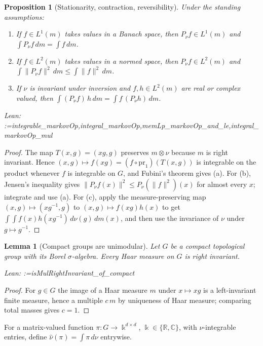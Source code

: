 \documentclass[11pt]{amsart}
\makeatletter
\newtheorem{proposition}[theorem]{Proposition}
\newtheorem{lemma}[theorem]{Lemma}
\theoremstyle{definition}
\theoremstyle{remark}
\newcommand{\@leanlist}[1]{\def\@leansep{}\@for\@leanname:=#1\do{\@leansep
  \texttt{\expandafter\detokenize\expandafter{\@leanname}}\def\@leansep{, }}}
\newcommand{\lean}[1]{\par\smallskip\noindent
  {\footnotesize\normalfont\raggedright\textsf{Lean:} \@leanlist{#1}\par}}
\newcommand{\R}{\mathbb{R}}
\newcommand{\C}{\mathbb{C}}
\makeatother
\begin{document}
\begin{proposition}[Stationarity, contraction, reversibility]\label{prop:compact-basic}
Under the standing assumptions:
\begin{enumerate}
\item[(a)] If $f\in L^1(m)$ takes values in a Banach space, then $P_\nu f\in L^1(m)$ and
$\int P_\nu f\,dm=\int f\,dm$.
\item[(b)] If $f\in L^2(m)$ takes values in a normed space, then $P_\nu f\in L^2(m)$ and
$\int\lVert P_\nu f\rVert^2\,dm\le\int\lVert f\rVert^2\,dm$.
\item[(c)] If $\nu$ is invariant under inversion and $f,h\in L^2(m)$ are real or complex valued,
then $\int(P_\nu f)\,h\,dm=\int f\,(P_\nu h)\,dm$.
\end{enumerate}
\lean{integrable_markovOp,integral_markovOp,memLp_markovOp_and_le,integral_markovOp_mul}
\end{proposition}

\begin{proof}
The map $T(x,g)=(xg,g)$ preserves $m\otimes\nu$ because $m$ is right invariant.  Hence
$(x,g)\mapsto f(xg)=(f\circ\mathrm{pr}_1)(T(x,g))$ is integrable on the product whenever $f$ is
integrable on $G$, and Fubini's theorem gives (a).  For (b), Jensen's inequality gives
$\lVert P_\nu f(x)\rVert^2\le P_\nu(\lVert f\rVert^2)(x)$ for almost every $x$; integrate and use
(a).  For (c), apply the measure-preserving map $(x,g)\mapsto(xg^{-1},g)$ to
$(x,g)\mapsto f(xg)h(x)$ to get $\int\!\!\int f(x)h(xg^{-1})\,d\nu(g)\,dm(x)$, and then use the
invariance of $\nu$ under $g\mapsto g^{-1}$.
\end{proof}

\begin{lemma}[Compact groups are unimodular]\label{lem:haar}
Let $G$ be a compact topological group with its Borel $\sigma$-algebra.  Every Haar measure on
$G$ is right invariant.
\lean{isMulRightInvariant_of_compact}
\end{lemma}

\begin{proof}
For $g\in G$ the image of a Haar measure $m$ under $x\mapsto xg$ is a left-invariant finite
measure, hence a multiple $c\,m$ by uniqueness of Haar measure; comparing total masses gives
$c=1$.
\end{proof}

For a matrix-valued function $\pi\colon G\to\Bbbk^{d\times d}$, $\Bbbk\in\{\R,\C\}$, with
$\nu$-integrable entries, define $\hat\nu(\pi)=\int\pi\,d\nu$ entrywise.
\end{document}
